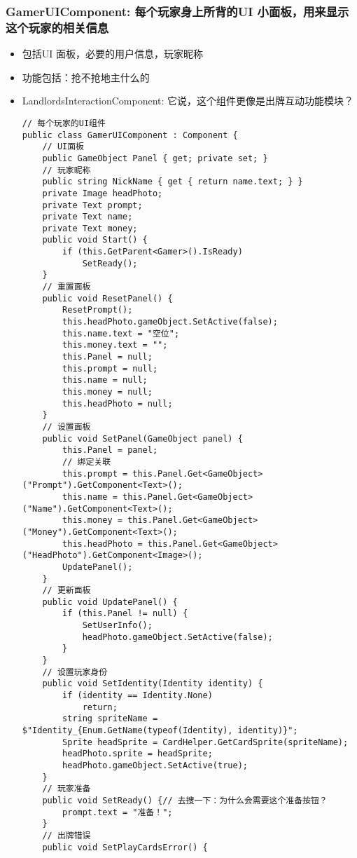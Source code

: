 \documentclass[9pt, b5paper]{article}
\begin{document}
\subsubsection{GamerUIComponent: 每个玩家身上所背的UI 小面板，用来显示这个玩家的相关信息}
\label{sec-1-7-1}
\begin{itemize}
\item 包括UI 面板，必要的用户信息，玩家昵称
\item 功能包括：抢不抢地主什么的
\item LandlordsInteractionComponent: 它说，这个组件更像是出牌互动功能模块？
\begin{verbatim}
// 每个玩家的UI组件
public class GamerUIComponent : Component {
    // UI面板
    public GameObject Panel { get; private set; }
    // 玩家昵称
    public string NickName { get { return name.text; } }
    private Image headPhoto;
    private Text prompt;
    private Text name;
    private Text money;
    public void Start() {
        if (this.GetParent<Gamer>().IsReady) 
            SetReady();
    }
    // 重置面板
    public void ResetPanel() {
        ResetPrompt();
        this.headPhoto.gameObject.SetActive(false);
        this.name.text = "空位";
        this.money.text = "";
        this.Panel = null;
        this.prompt = null;
        this.name = null;
        this.money = null;
        this.headPhoto = null;
    }
    // 设置面板
    public void SetPanel(GameObject panel) {
        this.Panel = panel;
        // 绑定关联
        this.prompt = this.Panel.Get<GameObject>("Prompt").GetComponent<Text>();
        this.name = this.Panel.Get<GameObject>("Name").GetComponent<Text>();
        this.money = this.Panel.Get<GameObject>("Money").GetComponent<Text>();
        this.headPhoto = this.Panel.Get<GameObject>("HeadPhoto").GetComponent<Image>();
        UpdatePanel();
    }
    // 更新面板
    public void UpdatePanel() {
        if (this.Panel != null) {
            SetUserInfo();
            headPhoto.gameObject.SetActive(false);
        }
    }
    // 设置玩家身份
    public void SetIdentity(Identity identity) {
        if (identity == Identity.None)
            return;
        string spriteName = $"Identity_{Enum.GetName(typeof(Identity), identity)}";
        Sprite headSprite = CardHelper.GetCardSprite(spriteName);
        headPhoto.sprite = headSprite;
        headPhoto.gameObject.SetActive(true);
    }
    // 玩家准备
    public void SetReady() {// 去搜一下：为什么会需要这个准备按钮？
        prompt.text = "准备！";
    }
    // 出牌错误
    public void SetPlayCardsError() {

\end{verbatim}
\end{itemize}
\end{document}
